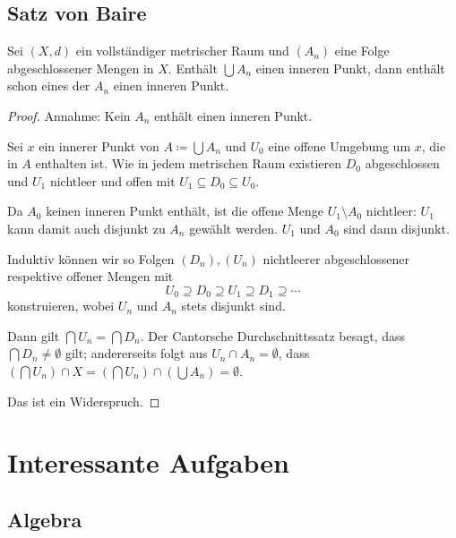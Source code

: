 \documentclass[ngerman, 11pt, a4paper, twoside, abstracton]{scrbook}
\begin{document}
\section{Satz von Baire}

\begin{theorem}
  Sei $\left( X, d \right)$ ein vollständiger metrischer Raum und $\left( A_n \right)$ eine Folge abgeschlossener Mengen in $X$. Enthält $\bigcup A_n$ einen inneren Punkt, dann enthält schon eines der $A_n$ einen inneren Punkt.
\end{theorem}
\begin{proof}
  Annahme: Kein $A_n$ enthält einen inneren Punkt.

  Sei $x$ ein innerer Punkt von $A\coloneqq\bigcup A_n$ und $U_0$ eine offene Umgebung um $x$, die in $A$ enthalten ist. Wie in jedem metrischen Raum existieren $D_0$ abgeschlossen und $U_1$ nichtleer und offen mit $U_1 \subseteq D_0 \subseteq U_0$.
  
  Da $A_0$ keinen inneren Punkt enthält, ist die offene Menge $U_1 \setminus A_0$ nichtleer: $U_1$ kann damit auch disjunkt zu $A_n$ gewählt werden. $U_1$ und $A_0$ sind dann disjunkt.

  Induktiv können wir so Folgen $\left( D_n \right), \left( U_n \right)$ nichtleerer abgeschlossener respektive offener Mengen mit
  \[
    U_0 \supseteq D_0 \supseteq U_1 \supseteq D_1 \supseteq \cdots
  \]
  konstruieren, wobei $U_n$ und $A_n$ stets disjunkt sind.

  Dann gilt $\bigcap U_n = \bigcap D_n$. Der Cantorsche Durchschnittssatz besagt, dass $\bigcap D_n \ne \emptyset$ gilt; andererseits folgt aus $U_n \cap A_n = \emptyset$, dass $\left( \bigcap U_n \right) \cap X = \left( \bigcap U_n \right) \cap \left( \bigcup A_n \right) = \emptyset$.

  Das ist ein Widerspruch.
\end{proof}
\appendix

\chapter{Interessante Aufgaben}

\section{Algebra}
\end{document}
